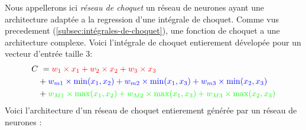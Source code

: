 Nous appellerons ici \emph{réseau de choquet} un réseau de neurones ayant une architecture
adaptée a la regression d'une intégrale de choquet.
Comme vus precedement (\ref{subsec:intégrales-de-choquet}),
une fonction de choquet a une architecture complexe.
Voici l'intégrale de choquet entierement dévelopée pour un vecteur d'entrée taille $3$:
\begin{align*}
    C&\ =
    \color{red}
    w_1 \times x_1 + w_2 \times x_2 + w_3 \times x_3 \\
    \color{black}
    & +
    \color{blue}
    w_{m1} \times \min(x_1, x_2) + w_{m2} \times \min(x_1, x_3) + w_{m3} \times \min(x_2, x_3) \\
    \color{black}
    & +
    \color{green}
    w_{M1} \times \max(x_1, x_2) + w_{M2} \times \max(x_1, x_3) + w_{M3} \times \max(x_2, x_3)
\end{align*}
Voici l'architecture d'un réseau de choquet entierement générée par un réseau de neurones :

